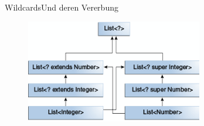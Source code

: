 \begin{frame}{Wildcards}{Und deren Vererbung}
    \begin{figure}
        \centering
        \includegraphics[height=4.5cm]{graph/generics-wildcardSubtyping}
    \end{figure}
\end{frame}
